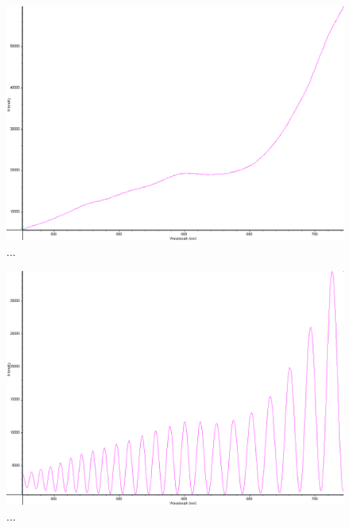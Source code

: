\documentclass[a4paper]{article}
\begin{document}
\FloatBarrier
\begin{figure}[h!]
	\centering
	\includegraphics[width=\linewidth]{data/spektra_180_kristall2_70_inv}
	\caption{...}
	\label{fig:}
\end{figure}
\FloatBarrier

\FloatBarrier
\begin{figure}[h!]
	\centering
	\includegraphics[width=\linewidth]{data/spektra_180_kristall3_140_inv}
	\caption{...}
	\label{fig:}
\end{figure}
\FloatBarrier
\end{document}
